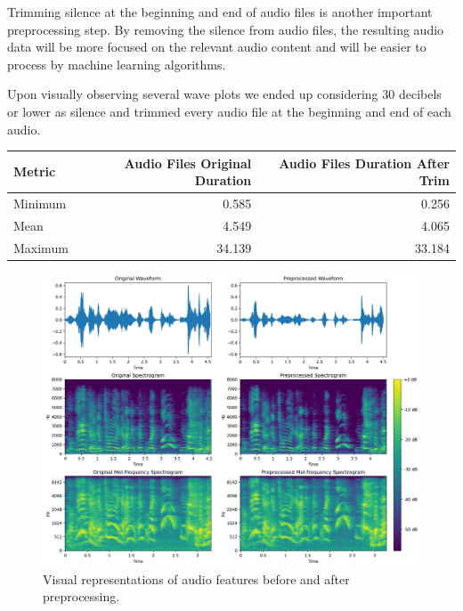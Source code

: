 Trimming silence at the beginning and end of audio files is another important preprocessing step. By removing the silence from audio files, the resulting audio data will be more focused on the relevant audio content and will be easier to process by machine learning algorithms.

Upon visually observing several wave plots we ended up considering 30 decibels or lower as silence and trimmed every audio file at the beginning and end of each audio.


\begin{tabular}{lrr}
	\toprule
	Metric &   Audio Files Original Duration & Audio Files Duration After Trim \\
	\midrule
	Minimum  	&  0.585 	&  0.256 \\
	Mean 		&  4.549  	&  4.065 \\
	Maximum 	& 34.139   	& 33.184 \\
	\bottomrule
\end{tabular}

\begin{figure}[H]
	\centering
	\includegraphics[width=\textwidth]{figs/4_2_preprocessing/preprocessing.png}
	\caption{Visual representations of audio features before and after preprocessing.}
	\label{fig:prep}
\end{figure}










